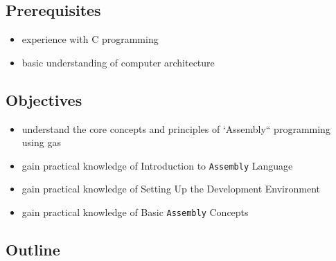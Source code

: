 \documentclass[
]{article}
\providecommand{\tightlist}{%
  \setlength{\itemsep}{0pt}\setlength{\parskip}{0pt}}
\begin{document}
\subsection{Prerequisites}\label{prerequisites}

\begin{itemize}
\tightlist
\item
  experience with C programming
\item
  basic understanding of computer architecture
\end{itemize}

\subsection{Objectives}\label{objectives}

\begin{itemize}
\tightlist
\item
  understand the core concepts and principles of `Assembly`` programming
  using gas
\item
  gain practical knowledge of Introduction to \texttt{Assembly} Language
\item
  gain practical knowledge of Setting Up the Development Environment
\item
  gain practical knowledge of Basic \texttt{Assembly} Concepts
\end{itemize}

\subsection{Outline}\label{outline}
\end{document}
